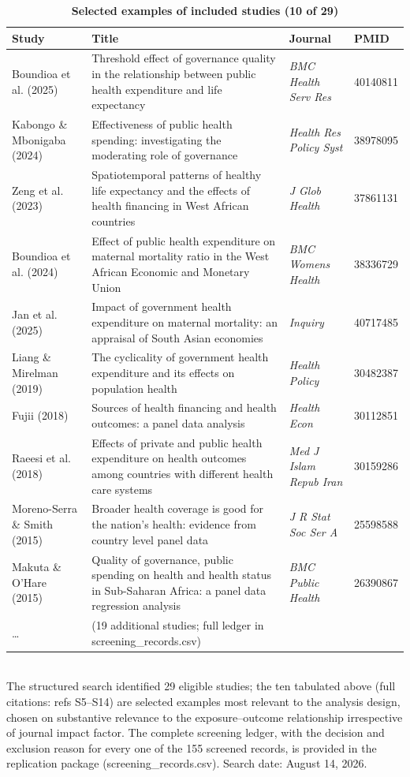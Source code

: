 \documentclass[10pt,a4paper]{article}
\begin{document}
\begin{table}[H]\centering
{\small\caption{\textbf{Selected examples of included studies (10 of 29)}}\label{tab:S14}}
\begin{tabular}{>{\raggedright\arraybackslash}p{}p{}p{}p{}}\toprule
\textbf{Study} & \textbf{Title} & \textbf{Journal} & \textbf{PMID}\\\midrule
Boundioa et al. (2025) & Threshold effect of governance quality in the relationship between public health expenditure and life expectancy & \textit{BMC Health Serv Res} & 40140811\\
Kabongo \& Mbonigaba (2024) & Effectiveness of public health spending: investigating the moderating role of governance & \textit{Health Res Policy Syst} & 38978095\\
Zeng et al. (2023) & Spatiotemporal patterns of healthy life expectancy and the effects of health financing in West African countries & \textit{J Glob Health} & 37861131\\
Boundioa et al. (2024) & Effect of public health expenditure on maternal mortality ratio in the West African Economic and Monetary Union & \textit{BMC Womens Health} & 38336729\\
Jan et al. (2025) & Impact of government health expenditure on maternal mortality: an appraisal of South Asian economies & \textit{Inquiry} & 40717485\\
Liang \& Mirelman (2019) & The cyclicality of government health expenditure and its effects on population health & \textit{Health Policy} & 30482387\\
Fujii (2018) & Sources of health financing and health outcomes: a panel data analysis & \textit{Health Econ} & 30112851\\
Raeesi et al. (2018) & Effects of private and public health expenditure on health outcomes among countries with different health care systems & \textit{Med J Islam Repub Iran} & 30159286\\
Moreno-Serra \& Smith (2015) & Broader health coverage is good for the nation's health: evidence from country level panel data & \textit{J R Stat Soc Ser A} & 25598588\\
Makuta \& O'Hare (2015) & Quality of governance, public spending on health and health status in Sub-Saharan Africa: a panel data regression analysis & \textit{BMC Public Health} & 26390867\\
\ldots & (19 additional studies; full ledger in screening\_records.csv) & &\\\bottomrule
\end{tabular}\\[6pt]
{\footnotesize The structured search identified 29 eligible studies; the ten tabulated above (full citations: refs S5--S14) are selected examples most relevant to the analysis design, chosen on substantive relevance to the exposure--outcome relationship irrespective of journal impact factor. The complete screening ledger, with the decision and exclusion reason for every one of the 155 screened records, is provided in the replication package (screening\_records.csv). Search date: August 14, 2026.}
\end{table}
\end{document}
